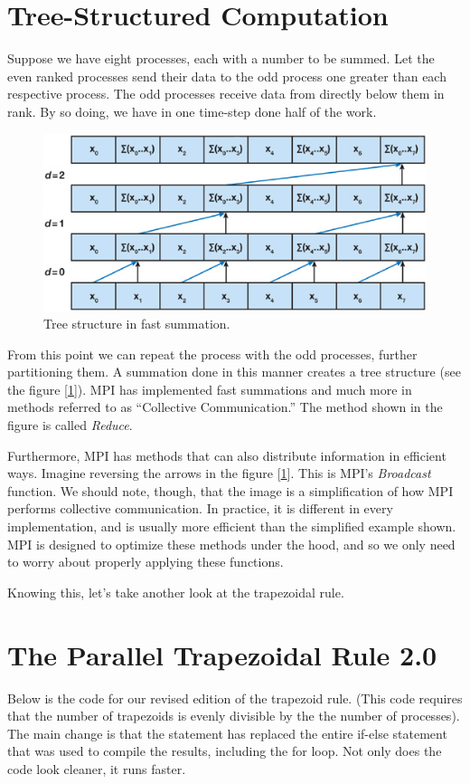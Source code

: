 \section*{Tree-Structured Computation}
  Suppose we have eight processes, each with a number to be summed. Let the even ranked processes send their data to the odd process one greater than each respective process. The odd processes receive data from directly below them in rank. By so doing, we have in one time-step done half of the work.

  \begin{figure}[htbp]
  \centering
  \includegraphics[width=.9\textwidth]{fastSum.png}
  \caption{Tree structure in fast summation.}
  \label{fig:fast_sum}
  \end{figure}


  From this point we can repeat the process with the odd processes, further partitioning them. A summation done in this manner creates a tree structure (see the figure [\ref{fig:fast_sum}]). MPI has implemented fast summations and much more in methods referred to as ``Collective Communication.'' The method shown in the figure is called \emph{Reduce}.

  Furthermore, MPI has methods that can also distribute information in efficient ways. Imagine reversing the arrows in the figure [\ref{fig:fast_sum}]. This is MPI's \emph{Broadcast} function. We should note, though, that the image is a simplification of how MPI performs collective communication. In practice, it is different in every implementation, and is usually more efficient than the simplified example shown. MPI is designed to optimize these methods under the hood, and so we only need to worry about properly applying these functions.

  Knowing this, let's take another look at the trapezoidal rule.


\section*{The Parallel Trapezoidal Rule 2.0}
  Below is the code for our revised edition of the trapezoid rule. (This code requires that the number of trapezoids is evenly divisible by the the number of processes). The main change is that the statement  has replaced the entire if-else statement that was used to compile the results, including the for loop. Not only does the code look cleaner, it runs faster.

